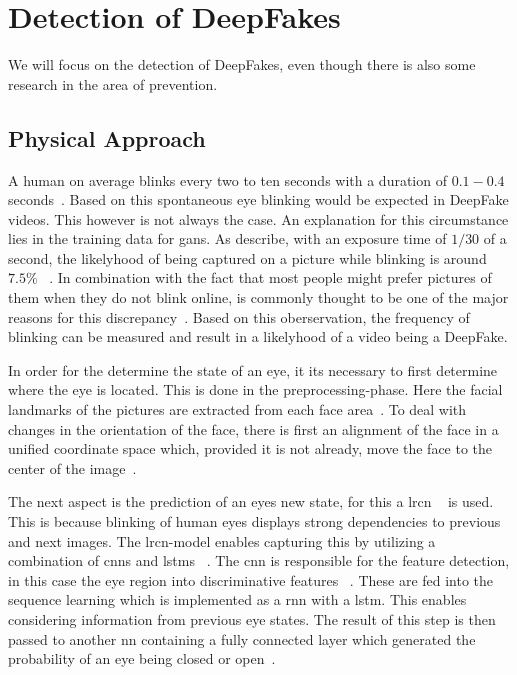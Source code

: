 \section{Detection of DeepFakes}
We will focus on the detection of DeepFakes, even though there is also some 
research in the area of prevention.

\subsection{Physical Approach}
A human on average blinks every two to ten seconds with a duration of \(0.1-0.4\)
seconds~\cite{li_ictu_2018}. Based on this spontaneous eye blinking would be
expected in DeepFake videos. This however is not always the case. An explanation
for this circumstance lies in the training data for \glspl{gan}. As 
\textcite{li_ictu_2018} describe, with an exposure time of \(1/30\) of a second,
the likelyhood of being captured on a picture while blinking is around \(7.5\%\)
~\cite{li_ictu_2018}. In combination with the fact that most people might prefer
pictures of them when they do not blink online, is commonly thought to be one of
the major reasons for this discrepancy~\cite{pishori_detecting_2020}. Based on
this oberservation, the frequency of blinking can be measured and result in a 
likelyhood of a video being a DeepFake.

\par
In order for the determine the state of an eye, it its necessary to first determine
where the eye is located. This is done in the preprocessing-phase. Here the facial
landmarks of the pictures are extracted from each face area~\cite{li_ictu_2018}.
To deal with changes in the orientation of the face, there is first an alignment
of the face in a unified coordinate space which, provided it is not already,
move the face to the center of the image~\cite{li_ictu_2018}.

\par
The next aspect is the prediction of an eyes new state, for this a \gls{lrcn}
~\cite{donahue_long-term_2014} is used. This is because blinking of human eyes
displays strong dependencies to previous and next images. The \gls{lrcn}-model 
enables capturing this by utilizing a combination of \glspl{cnn} and \glspl{lstm}
~\cite{donahue_long-term_2014}. The \gls{cnn} is responsible for the feature
detection, in this case the eye region into discriminative features
~\cite{li_ictu_2018,donahue_long-term_2014}. 
These are fed into the sequence learning which is implemented as a \gls{rnn} 
with a \gls{lstm}. This enables considering information from previous eye states.
The result of this step is then passed to another \gls{nn} containing a fully
connected layer which generated the probability of an eye being closed or open~\cite{li_ictu_2018}.

